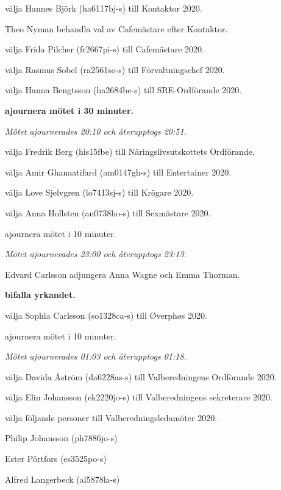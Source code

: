 \documentclass[10pt]{article}
\begin{document}
\begin{paragrafer}
\begin{paralist}
    \Mba välja Hannes Björk (ha6117bj-s) till Kontaktor 2020. 

    Theo Nyman \ypa behandla val av Cafemästare efter Kontaktor.

    \textbf{\Mbaby}

    \Mba välja Frida Pilcher (fr2667pi-s) till Cafemästare 2020.

    \Mba välja Rasmus Sobel (ra2561so-s) till Förvaltningschef 2020. 

    \Mba välja Hanna Bengtsson (ha2684be-s) till SRE-Ordförande 2020. 
    
    \textbf{\Mba ajournera mötet i 30 minuter.}

    \emph{Mötet ajournerades 20:10 och återupptogs 20:51.}

    \Mba välja Fredrik Berg (his15fbe) till Näringslivsutskottets Ordförande.

    \Mba välja Amir Ghanaatifard (am0147gh-s) till Entertainer 2020. 

    \Mba välja Love Sjelvgren (lo7413sj-s) till Krögare 2020. 
    
    \Mba välja Anna Hollsten (an0738ho-s) till Sexmästare 2020. 


    \Mba ajournera mötet i 10 minuter.

    \emph{Mötet ajournerades 23:00 och återupptogs 23:13.}

    Edvard Carlsson \ypa adjungera Anna Wagne och Emma Thorman.

    \textbf{\Mba bifalla yrkandet.}

    \Mba välja Sophia Carlsson (so1328ca-s) till Øverphøs 2020.

    \Mba ajournera mötet i 10 minuter.
    
    
    \emph{Mötet ajournerades 01:03 och återupptogs 01:18.}

        \Mba välja Davida Åström (da6228as-s) till Valberedningens Ordförande 2020.

        \Mba välja Elin Johansson (ek2220jo-s) till Valberedningens sekreterare 2020.

        \Mba välja följande personer till Valberedningsledamöter 2020.
        \begin{tightdashlist}
            \item Philip Johansson (ph7886jo-s)
            \item Ester Pörtfors (es3525po-s)
            \item Alfred Langerbeck (al5878la-s)
        \end{tightdashlist}
        

\end{paralist}
\end{paragrafer}
\end{document}
